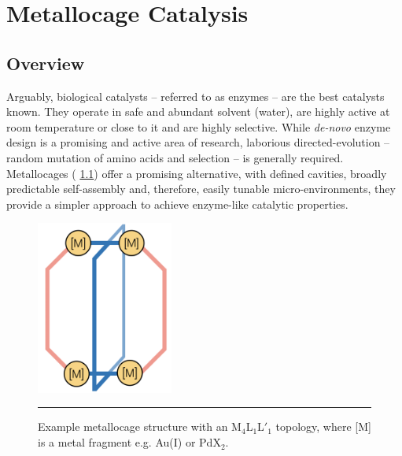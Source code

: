 \documentclass[../../main.tex]{subfiles}
\begin{document}
\setcounter{footnote}{0} 
\newcommand{\rom}[1]{\uppercase\expandafter{\romannumeral #1\relax}}


\chapter{Metallocage Catalysis}

\section{Overview}

Arguably, biological catalysts -- referred to as enzymes -- are the best catalysts known. They operate in safe and abundant solvent (water), are highly active at room temperature or close to it and are highly selective. While \emph{de-novo} enzyme design is a promising and active area of research, laborious directed-evolution -- random mutation of amino acids and selection -- is generally required.\cite{Vller2020} Metallocages (\figurename{ \ref{fig::cage_overview_1}}) offer a promising alternative, with defined cavities, broadly predictable self-assembly and, therefore, easily tunable micro-environments, they provide a simpler approach to achieve enzyme-like catalytic properties.\cite{Sepehrpour2019}

\begin{figure}[h!]
	\vspace{0.4cm}
	\centering
	\includegraphics[width=4.5cm]{3/overview/figs/fig1/fig1}
	\vspace{0.3cm}
	\hrule
	\caption{Example metallocage structure with an M$_4$L$_1$L$'_1$ topology, where [M] is a metal fragment e.g. Au(I) or PdX$_2$.}
	\label{fig::cage_overview_1}
\end{figure}
\end{document}
